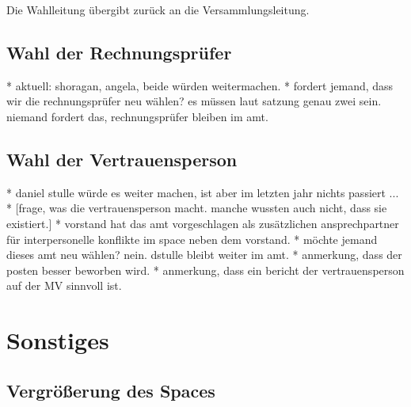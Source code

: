 \documentclass{s0minutes}
\begin{document}
Die Wahlleitung übergibt zurück an die Versammlungsleitung.

\subsection{Wahl der Rechnungsprüfer}

	* aktuell: shoragan, angela, beide würden weitermachen.
	* fordert jemand, dass wir die rechnungsprüfer neu wählen? es müssen laut satzung genau zwei sein. niemand fordert das, rechnungsprüfer bleiben im amt.

\subsection{Wahl der Vertrauensperson}

	* daniel stulle würde es weiter machen, ist aber im letzten jahr nichts passiert ...
	* [frage, was die vertrauensperson macht. manche wussten auch nicht, dass sie existiert.]
		* vorstand hat das amt vorgeschlagen als zusätzlichen ansprechpartner für interpersonelle konflikte im space neben dem vorstand.
	* möchte jemand dieses amt neu wählen? nein. dstulle bleibt weiter im amt.
	* anmerkung, dass der posten besser beworben wird.
	* anmerkung, dass ein bericht der vertrauensperson auf der MV sinnvoll ist.

\section{Sonstiges}

\subsection{Vergrößerung des Spaces}
\end{document}
